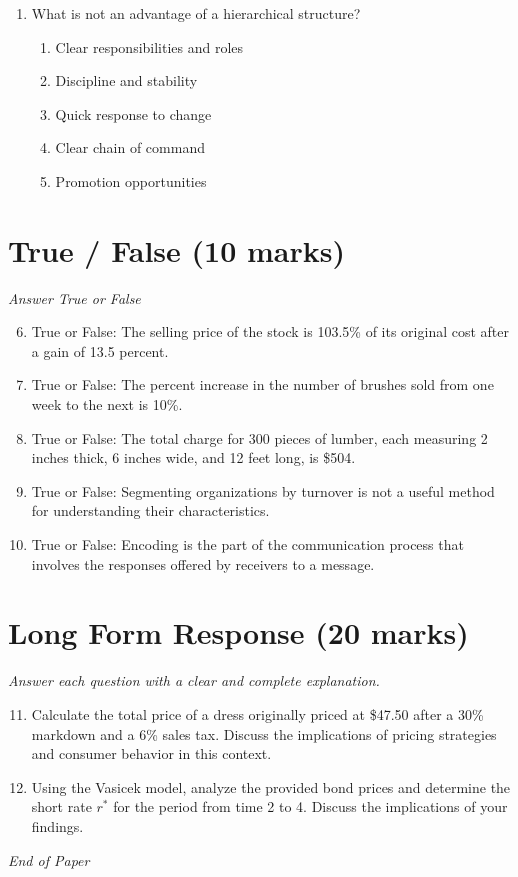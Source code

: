\documentclass[12pt]{article}
\begin{document}
\begin{enumerate}[label=\arabic*.]
\begin{enumerate}[label=(\alph*)]
    \item \$2,128.64
    \item \$2,080.00
    \item \$2,081.60
    \item \$2,200.00
    \item \$2,100.00
\end{enumerate}
\item What is not an advantage of a hierarchical structure?
\begin{enumerate}[label=(\alph*)]
    \item Clear responsibilities and roles
    \item Discipline and stability
    \item Quick response to change
    \item Clear chain of command
    \item Promotion opportunities
\end{enumerate}
\end{enumerate}

\section*{True / False (10 marks)}
\textit{Answer True or False}
\begin{enumerate}[label=\arabic*.]
\setcounter{enumi}{5}
\item True or False: The selling price of the stock is 103.5\% of its original cost after a gain of 13.5 percent.
\item True or False: The percent increase in the number of brushes sold from one week to the next is 10\%.
\item True or False: The total charge for 300 pieces of lumber, each measuring 2 inches thick, 6 inches wide, and 12 feet long, is \$504.
\item True or False: Segmenting organizations by turnover is not a useful method for understanding their characteristics.
\item True or False: Encoding is the part of the communication process that involves the responses offered by receivers to a message.
\end{enumerate}

\section*{Long Form Response (20 marks)}
\textit{Answer each question with a clear and complete explanation.}
\begin{enumerate}[label=\arabic*.]
\setcounter{enumi}{10}
\item Calculate the total price of a dress originally priced at \$47.50 after a 30\% markdown and a 6\% sales tax. Discuss the implications of pricing strategies and consumer behavior in this context.
\item Using the Vasicek model, analyze the provided bond prices and determine the short rate \( r^* \) for the period from time 2 to 4. Discuss the implications of your findings.
\end{enumerate}

\vfill
\noindent\textit{End of Paper}
\end{document}
